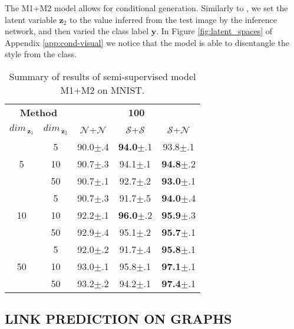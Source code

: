 \documentclass[letterpaper]{article}
\newcommand{\Sv}{$\mathcal{S}$}
\newcommand{\Nv}{$\mathcal{N}$}
\newcommand{\y}{\mathbf{y}}
\newcommand{\z}{\mathbf{z}}
\begin{document}
The M1+M2 model allows for conditional generation. Similarly to \citep{kingma-semi-super}, we set the latent variable $\z_2$ to the value inferred from the test image by the inference network, and then varied the class label $\y$. In Figure \ref{fig:latent_spaces} of Appendix \ref{app:cond-visual} we notice that the model is able to disentangle the style from the class.

\begin{table}[!ht]
    \centering
    \caption{Summary of results of semi-supervised model M1+M2 on MNIST.}
    \bigskip
    \begin{tabular}{cc|ccc}
    \toprule
    \multicolumn{2}{c}{\textbf{Method}} &
      \multicolumn{3}{c}{\textbf{100}} \\
      $dim_{\ \z_1}$ & $dim_{\ \z_2}$
      & \Nv+\Nv & \Sv+\Sv & \Sv+\Nv  \\
        \midrule
    \multirow{3}{*}{5}  & 5   & 90.0{\tiny$\pm$.4} & {\bf94.0}{\tiny$\pm$.1} & 93.8{\tiny$\pm$.1} \\
                        & 10  & 90.7{\tiny$\pm$.3} & 94.1{\tiny$\pm$.1} & {\bf94.8}{\tiny$\pm$.2} \\
                        & 50  & 90.7{\tiny$\pm$.1} & 92.7{\tiny$\pm$.2} & {\bf93.0}{\tiny$\pm$.1} \\
    \midrule
    \multirow{3}{*}{10} & 5   & 90.7{\tiny$\pm$.3} & 91.7{\tiny$\pm$.5} & {\bf94.0}{\tiny$\pm$.4} \\
                        & 10  & 92.2{\tiny$\pm$.1} & {\bf96.0}{\tiny$\pm$.2} & {\bf95.9}{\tiny$\pm$.3}\\
                        & 50  & 92.9{\tiny$\pm$.4} & 95.1{\tiny$\pm$.2} & {\bf95.7}{\tiny$\pm$.1} \\
    \midrule
    \multirow{3}{*}{50} & 5   & 92.0{\tiny$\pm$.2} & 91.7{\tiny$\pm$.4} & {\bf95.8}{\tiny$\pm$.1} \\
                        & 10  & 93.0{\tiny$\pm$.1} & 95.8{\tiny$\pm$.1} & {\bf97.1}{\tiny$\pm$.1} \\
                        & 50  & 93.2{\tiny$\pm$.2} & 94.2{\tiny$\pm$.1} & {\bf97.4}{\tiny$\pm$.1} \\
    \bottomrule
    \end{tabular}
    \label{tab:m1m2}
\end{table}

\subsection{LINK PREDICTION ON GRAPHS}
\end{document}
